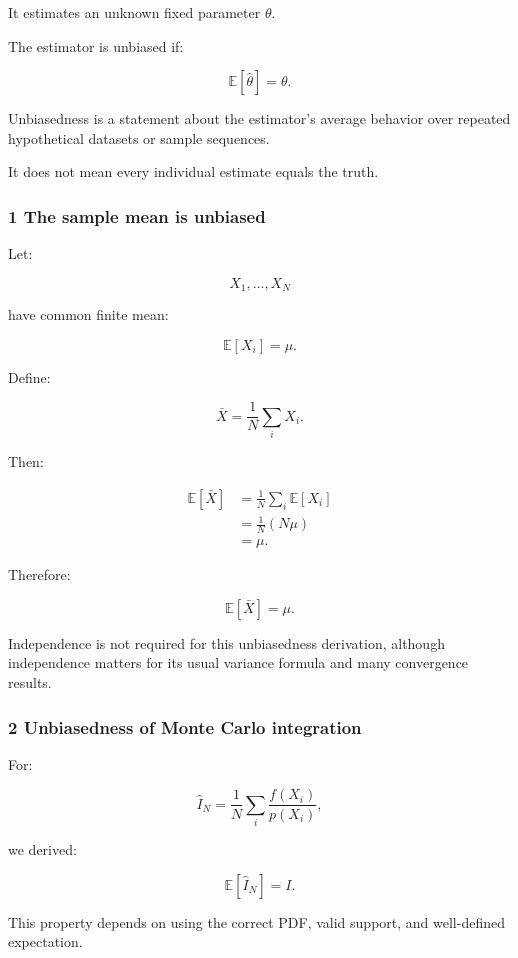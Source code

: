 It estimates an unknown fixed parameter \(\theta\).

The estimator is unbiased if:

\[
 \boxed{ \mathbb E[\widehat\theta]=\theta }.
\]

Unbiasedness is a statement about the estimator's average behavior over repeated hypothetical datasets or sample sequences.

It does not mean every individual estimate equals the truth.

\subsubsection{1 The sample mean is unbiased}\label{02-foundations-ii-ch030-the-sample-mean-is-unbiased}

Let:

\[
 X_1,\ldots,X_N
\]

have common finite mean:

\[
 \mathbb E[X_i]=\mu.
\]

Define:

\[
 \bar X=\frac1N\sum_iX_i.
\]

Then:

\[
 \begin{aligned} \mathbb E[\bar X] &=\frac1N\sum_i\mathbb E[X_i]\\ &=\frac1N(N\mu)\\ &=\mu. \end{aligned}
\]

Therefore:

\[
 \boxed{\mathbb E[\bar X]=\mu}.
\]

Independence is not required for this unbiasedness derivation, although independence matters for its usual variance formula and many convergence results.

\subsubsection{2 Unbiasedness of Monte Carlo integration}\label{02-foundations-ii-ch030-unbiasedness-of-monte-carlo-integration}

For:

\[
 \widehat I_N= \frac1N\sum_i\frac{f(X_i)}{p(X_i)},
\]

we derived:

\[
 \mathbb E[\widehat I_N]=I.
\]

This property depends on using the correct PDF, valid support, and well-defined expectation.

